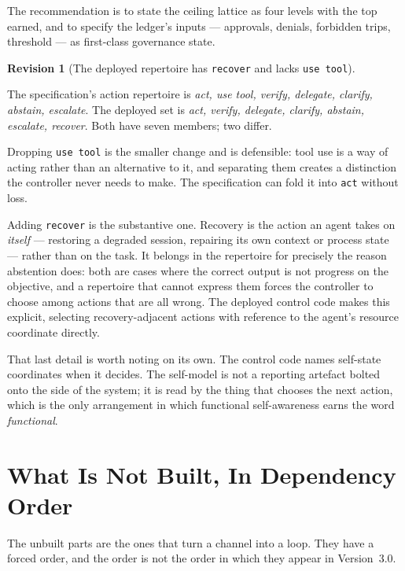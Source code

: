 \documentclass[11pt]{article}
\newtheorem{revision}{Revision}
\newcommand{\code}[1]{\texttt{\small #1}}
\begin{document}
The recommendation is to state the ceiling lattice as four levels with the top earned, and to specify the ledger's inputs --- approvals, denials, forbidden trips, threshold --- as first-class governance state.

\begin{revision}[The deployed repertoire has \code{recover} and lacks \code{use tool}]
\label{rev:recover}
\end{revision}

\noindent The specification's action repertoire is \emph{act, use tool, verify, delegate, clarify, abstain, escalate}. The deployed set is \emph{act, verify, delegate, clarify, abstain, escalate, recover}. Both have seven members; two differ.

Dropping \code{use tool} is the smaller change and is defensible: tool use is a way of acting rather than an alternative to it, and separating them creates a distinction the controller never needs to make. The specification can fold it into \code{act} without loss.

Adding \code{recover} is the substantive one. Recovery is the action an agent takes on \emph{itself} --- restoring a degraded session, repairing its own context or process state --- rather than on the task. It belongs in the repertoire for precisely the reason abstention does: both are cases where the correct output is not progress on the objective, and a repertoire that cannot express them forces the controller to choose among actions that are all wrong. The deployed control code makes this explicit, selecting recovery-adjacent actions with reference to the agent's resource coordinate directly.

That last detail is worth noting on its own. The control code names self-state coordinates when it decides. The self-model is not a reporting artefact bolted onto the side of the system; it is read by the thing that chooses the next action, which is the only arrangement in which functional self-awareness earns the word \emph{functional}.

\section{What Is Not Built, In Dependency Order}
\label{sec:notbuilt}

The unbuilt parts are the ones that turn a channel into a loop. They have a forced order, and the order is not the order in which they appear in Version~3.0.
\end{document}
